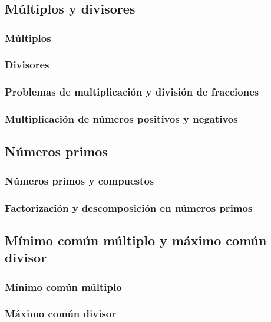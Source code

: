 \documentclass[11pt]{book}
\begin{document}
\pagestyle{empty}

\restoregeometry
{}
\tableofcontents
\newpage
\chapter{}
\pagestyle{fancy}
\newpage \thispagestyle{plain}
\section{Múltiplos y divisores}
\subsection{Múltiplos}
\subsection{Divisores}
\subsection{Problemas de multiplicación y división de fracciones}
\subsection{Multiplicación de números positivos y negativos}

\newpage \thispagestyle{plain}
\section{Números primos}
\subsection{Números primos y compuestos}
\subsection{Factorización y descomposición en números primos}

\newpage \thispagestyle{plain}
\section{Mínimo común múltiplo y máximo común divisor}
\subsection{Mínimo común múltiplo}
\subsection{Máximo común divisor}
\end{document}
